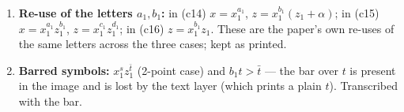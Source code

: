 \documentclass[11pt]{article}
\newcommand{\ztil}{\widetilde{z}}              %
\newcommand{\tbar}{\bar{t}}                    %
\begin{document}
\begin{enumerate}
      ``the strict transform of $\ztil = 0$ in $U'$''; the ``final case'' paragraph says
      ``the strict transform of $z = 0$ in $U'$''. Both kept as printed.
\item \textbf{Re-use of the letters $a_1, b_1$:} in (c14) $x = x_1^{a_1}$,
      $z = x_1^{b_1}(z_1+\alpha)$; in (c15) $x = x_1^{a_1}z_1^{b_1}$,
      $z = x_1^{c_1}z_1^{d_1}$; in (c16) $z = x_1^{b_1}z_1$. These are the paper's own
      re-uses of the same letters across the three cases; kept as printed.
\item \textbf{Barred symbols:} $x_1^s z_1^{\tbar}$ (2-point case) and $b_1 t > \tbar$ ---
      the bar over $t$ is present in the image and is lost by the text layer (which prints
      a plain $t$). Transcribed with the bar.
\end{enumerate}
\end{document}
